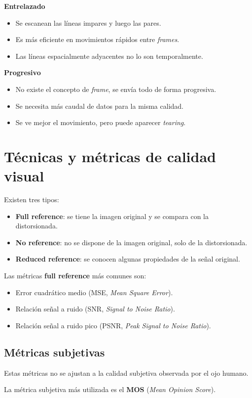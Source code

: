 \documentclass[11pt,a4paper]{article}
\begin{document}
\textbf{Entrelazado}
\begin{itemize}
    \item Se escanean las líneas impares y luego las pares.
    \item Es más eficiente en movimientos rápidos entre \textit{frames}.
    \item Las líneas espacialmente adyacentes no lo son temporalmente.
\end{itemize}

\textbf{Progresivo}
\begin{itemize}
    \item No existe el concepto de \textit{frame}, se envía todo de forma progresiva.
    \item Se necesita más caudal de datos para la misma calidad.
    \item Se ve mejor el movimiento, pero puede aparecer \textit{tearing}.
\end{itemize}

\section{Técnicas y métricas de calidad visual}

Existen tres tipos:
\begin{itemize}
    \item \textbf{Full reference}: se tiene la imagen original y se compara con la distorsionada.
    \item \textbf{No reference}: no se dispone de la imagen original, solo de la distorsionada.
    \item \textbf{Reduced reference}: se conocen algunas propiedades de la señal original.
\end{itemize}

Las métricas \textbf{full reference} más comunes son:
\begin{itemize}
    \item Error cuadrático medio (MSE, \textit{Mean Square Error}).
    \item Relación señal a ruido (SNR, \textit{Signal to Noise Ratio}).
    \item Relación señal a ruido pico (PSNR, \textit{Peak Signal to Noise Ratio}).
\end{itemize}

\subsection{Métricas subjetivas}

Estas métricas no se ajustan a la calidad subjetiva observada por el ojo humano.

La métrica subjetiva más utilizada es el \textbf{MOS} (\textit{Mean Opinion Score}).
\end{document}
